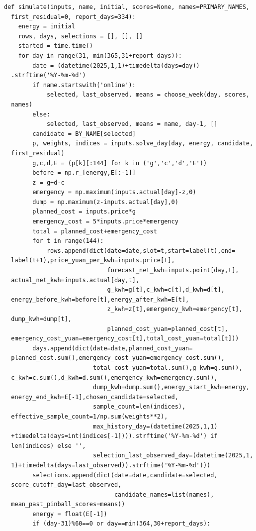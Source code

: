 \begin{verbatim}
def simulate(inputs, name, initial, scores=None, names=PRIMARY_NAMES,
  first_residual=0, report_days=334):
    energy = initial
    rows, days, selections = [], [], []
    started = time.time()
    for day in range(31, min(365,31+report_days)):
        date = (datetime(2025,1,1)+timedelta(days=day))
  .strftime('%Y-%m-%d')
        if name.startswith('online'):
            selected, last_observed, means = choose_week(day, scores,
  names)
        else:
            selected, last_observed, means = name, day-1, []
        candidate = BY_NAME[selected]
        p, weights, indices = inputs.solve_day(day, energy, candidate,
  first_residual)
        g,c,d,E = (p[k][:144] for k in ('g','c','d','E'))
        before = np.r_[energy,E[:-1]]
        z = g+d-c
        emergency = np.maximum(inputs.actual[day]-z,0)
        dump = np.maximum(z-inputs.actual[day],0)
        planned_cost = inputs.price*g
        emergency_cost = 5*inputs.price*emergency
        total = planned_cost+emergency_cost
        for t in range(144):
            rows.append(dict(date=date,slot=t,start=label(t),end=
  label(t+1),price_yuan_per_kwh=inputs.price[t],
                             forecast_net_kwh=inputs.point[day,t],
  actual_net_kwh=inputs.actual[day,t],
                             g_kwh=g[t],c_kwh=c[t],d_kwh=d[t],
  energy_before_kwh=before[t],energy_after_kwh=E[t],
                             z_kwh=z[t],emergency_kwh=emergency[t],
  dump_kwh=dump[t],
                             planned_cost_yuan=planned_cost[t],
  emergency_cost_yuan=emergency_cost[t],total_cost_yuan=total[t]))
        days.append(dict(date=date,planned_cost_yuan=
  planned_cost.sum(),emergency_cost_yuan=emergency_cost.sum(),
                         total_cost_yuan=total.sum(),g_kwh=g.sum(),
  c_kwh=c.sum(),d_kwh=d.sum(),emergency_kwh=emergency.sum(),
                         dump_kwh=dump.sum(),energy_start_kwh=energy,
  energy_end_kwh=E[-1],chosen_candidate=selected,
                         sample_count=len(indices),
  effective_sample_count=1/np.sum(weights**2),
                         max_history_day=(datetime(2025,1,1)
  +timedelta(days=int(indices[-1]))).strftime('%Y-%m-%d') if
  len(indices) else '',
                         selection_last_observed_day=(datetime(2025,1,
  1)+timedelta(days=last_observed)).strftime('%Y-%m-%d')))
        selections.append(dict(date=date,candidate=selected,
  score_cutoff_day=last_observed,
                               candidate_names=list(names),
  mean_past_pinball_scores=means))
        energy = float(E[-1])
        if (day-31)%60==0 or day==min(364,30+report_days):

\end{verbatim}
